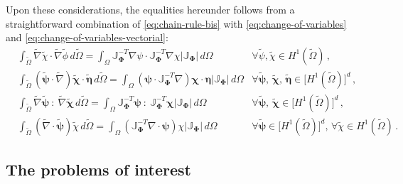 \documentclass[12pt, a4paper, twoside, openright]{report}
\numberwithin{equation}{chapter}
\theoremstyle{theorem}
\theoremstyle{definition}
\theoremstyle{remark}
\theoremstyle{proposition}
\numberwithin{figure}{chapter}
\newcommand{\wt}[1]{\widetilde{#1}}
\newcommand{\bg}[1]{\boldsymbol{#1}}
\begin{document}
		 Upon these considerations, the equalities hereunder follows from a straightforward combination of \eqref{eq:chain-rule-bis} with \eqref{eq:change-of-variables} and \eqref{eq:change-of-variables-vectorial}:
		\begin{align}
			\label{eq:change-of-variables-first}
			& \int_{\wt{\Omega}} \wt{\nabla} \wt{\chi} \cdot \wt{\nabla} \wt{\phi} \, d \wt{\Omega} = \int_{\Omega} \mathbb{J}^{-T}_{\bg{\Phi}} \nabla \psi \cdot \mathbb{J}^{-T}_{\bg{\Phi}} \nabla \chi \lvert \mathbb{J}_{\bg{\Phi}} \rvert \, d \Omega & \forall \wt{\psi}, \wt{\chi} \in H^1(\wt{\Omega}) \, , \\
			\label{eq:change-of-variables-second}
			& \int_{\wt{\Omega}} \left( \wt{\bg{\psi}} \cdot \wt{\nabla} \right) \wt{\bg{\chi}} \cdot \wt{\bg{\eta}} \, d \wt{\Omega} = \int_{\Omega} \left( \bg{\psi} \cdot \mathbb{J}^{-T}_{\bg{\Phi}} \nabla \right) \bg{\chi} \cdot \bg{\eta} \lvert \mathbb{J}_{\bg{\Phi}} \rvert \, d \Omega & \forall \wt{\bg{\psi}}, \, \wt{\bg{\chi}}, \, \wt{\bg{\eta}} \in \big[ H^1(\wt{\Omega}) \big]^d \, , \\
			\label{eq:change-of-variables-third}
			& \int_{\wt{\Omega}} \wt{\nabla} \wt{\bg{\psi}} ~ : ~ \wt{\nabla} \wt{\bg{\chi}} \, d \wt{\Omega} = \int_{\Omega} \mathbb{J}^{-T}_{\bg{\Phi}} \bg{\psi} ~ : ~ \mathbb{J}^{-T}_{\bg{\Phi}} \bg{\chi} \lvert \mathbb{J}_{\bg{\Phi}} \rvert \, d \Omega & \forall \wt{\bg{\psi}}, \, \wt{\bg{\chi}} \in \big[ H^1(\wt{\Omega}) \big]^d \, , \\
			\label{eq:change-of-variables-fourth}
			& \int_{\wt{\Omega}} \left( \wt{\nabla} \cdot \wt{\bg{\psi}} \right) \wt{\chi} \, d \wt{\Omega} = \int_{\Omega} \left( \mathbb{J}^{-T}_{\bg{\Phi}} \nabla \cdot \bg{\psi} \right) \chi \lvert \mathbb{J}_{\bg{\Phi}} \rvert \, d \Omega & \forall \wt{\bg{\psi}} \in \big[ H^1(\wt{\Omega}) \big]^d, \, \forall \wt{\chi} \in H^1(\wt{\Omega}) \, .
		\end{align}  
		
	\vspace*{0.3cm}
		
	\subsection{The problems of interest}
	\label{section:The problems of interest}
	
\end{document}
